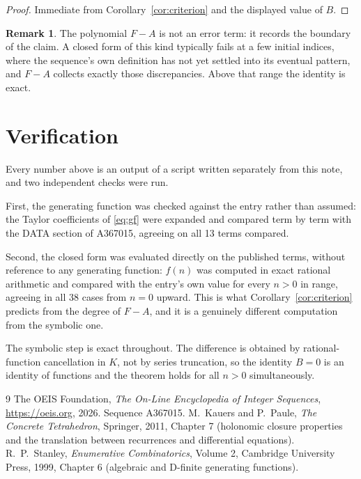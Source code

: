 \documentclass[11pt,a4paper]{article}
\theoremstyle{plain}
\theoremstyle{definition}
\newtheorem{remark}[theorem]{Remark}
\begin{document}
\begin{proof}
Immediate from Corollary~\ref{cor:criterion} and the displayed value of $B$.
\end{proof}

\begin{remark}
The polynomial $F-A$ is not an error term: it records the boundary of the claim. A closed
form of this kind typically fails at a few initial indices, where the sequence's own
definition has not yet settled into its eventual pattern, and $F-A$ collects exactly
those discrepancies. Above that range the identity is exact.
\end{remark}

\section{Verification}

Every number above is an output of a script written separately from this note, and two
independent checks were run.

First, the generating function was checked against the entry rather than assumed: the
Taylor coefficients of \eqref{eq:gf} were expanded and compared term by term with the DATA
section of A367015, agreeing on all 13 terms compared.

Second, the closed form was evaluated directly on the published terms, without reference
to any generating function: $f(n)$ was computed in exact rational arithmetic and compared
with the entry's own value for every $n>0$ in range, agreeing in all 38 cases
from $n=0$ upward. This is what Corollary~\ref{cor:criterion} predicts from the
degree of $F-A$, and it is a genuinely different computation from the symbolic one.

The symbolic step is exact throughout. The difference is obtained by rational-function
cancellation in $K$, not by series truncation, so the identity $B=0$ is an
identity of functions and the theorem holds for all $n>0$ simultaneously.

\begin{thebibliography}{9}
 The OEIS Foundation, \emph{The On-Line Encyclopedia of Integer Sequences},
\url{https://oeis.org}, 2026. Sequence A367015.
 M.~Kauers and P.~Paule, \emph{The Concrete Tetrahedron}, Springer, 2011,
Chapter 7 (holonomic closure properties and the translation between recurrences and
differential equations).
 R.~P.~Stanley, \emph{Enumerative Combinatorics}, Volume 2, Cambridge
University Press, 1999, Chapter 6 (algebraic and D-finite generating functions).
\end{thebibliography}
\end{document}
